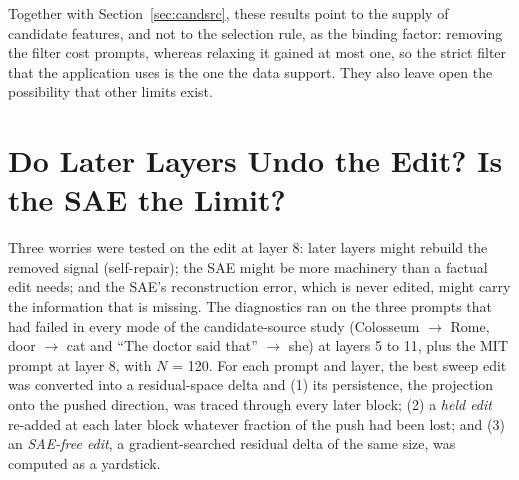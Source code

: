 \documentclass[12pt,a4paper]{report}
\begin{document}
Together with Section~\ref{sec:candsrc}, these results point to the supply of candidate features, and not to the selection rule, as the binding factor: removing the filter cost prompts, whereas relaxing it gained at most one, so the strict filter that the application uses is the one the data support. They also leave open the possibility that other limits exist.

\section{Do Later Layers Undo the Edit? Is the SAE the Limit?}\label{sec:repair}

Three worries were tested on the edit at layer 8: later layers might rebuild the removed signal (self-repair); the SAE might be more machinery than a factual edit needs; and the SAE's reconstruction error, which is never edited, might carry the information that is missing. The diagnostics ran on the three prompts that had failed in every mode of the candidate-source study (Colosseum $\rightarrow$ Rome, door $\rightarrow$ cat and ``The doctor said that'' $\rightarrow$ she) at layers 5 to 11, plus the MIT prompt at layer 8, with $N$ = 120. For each prompt and layer, the best sweep edit was converted into a residual-space delta and (1) its persistence, the projection onto the pushed direction, was traced through every later block; (2) a \textit{held edit} re-added at each later block whatever fraction of the push had been lost; and (3) an \textit{SAE-free edit}, a gradient-searched residual delta of the same size, was computed as a yardstick.
\end{document}
